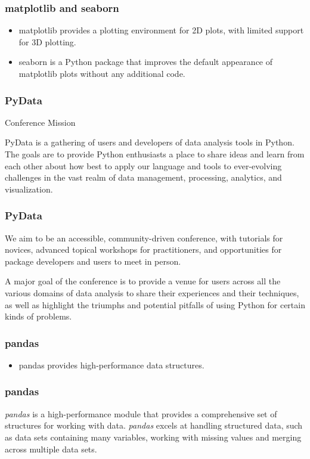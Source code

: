 \documentclass[MASTER.tex]{subfiles}
\begin{document}
\begin{frame}
\frametitle{matplotlib and seaborn}
\begin{itemize}
\item matplotlib provides a plotting environment for 2D plots, with limited support for 3D plotting. 
\item seaborn is
a Python package that improves the default appearance of matplotlib plots without any additional code.
\end{itemize}

\end{frame}
\begin{frame}
	\frametitle{PyData}
	Conference Mission

PyData is a gathering of users and developers of data analysis tools in Python. The goals are to provide Python enthusiasts a place to share ideas and learn from each other about how best to apply our language and tools to ever-evolving challenges in the vast realm of data management, processing, analytics, and visualization.

\end{frame}
\begin{frame}

\frametitle{PyData}

We aim to be an accessible, community-driven conference, with tutorials for novices, advanced topical workshops for practitioners, and opportunities for package developers and users to meet in person.

A major goal of the conference is to provide a venue for users across all the various domains of data analysis to share their experiences and their techniques, as well as highlight the triumphs and potential pitfalls of using Python for certain kinds of problems.

\end{frame}
\begin{frame}
\frametitle{pandas}
\begin{itemize}
\item pandas provides high-performance data structures.
\end{itemize}
\end{frame}
\begin{frame}
	\frametitle{pandas}
	\textit{pandas} is a high-performance module that provides a comprehensive set of structures for working with
	data. \textit{pandas} excels at handling structured data, such as data sets containing many variables, working with
	missing values and merging across multiple data sets. 
\end{frame}
\end{document}
